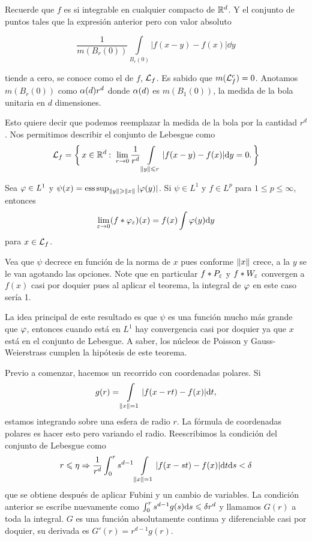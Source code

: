 \documentclass[12pt]{memoir}
\begin{document}
Recuerde que $f$ es  si integrable en cualquier compacto de $\mathbb{R}^d$. Y el conjunto de puntos tales que la expresión anterior pero con valor absoluto

$$\frac{1}{m(B_r(0))}\int\limits_{B_r(0)}|f(x-y)-f(x)|\dd y$$

tiende a cero, se conoce como el  de $f$, $\mathcal{L}_f$. Es sabido que $m(\mathcal{L}_f^c)=0$. Anotamos $m(B_r(0))$ como $\alpha(d)r^d$ donde $\alpha(d)$ es $m(B_1(0))$, la medida de la bola unitaria en $d$ dimensiones.\par 
Esto quiere decir que podemos reemplazar la medida de la bola por la cantidad $r^d$. Nos permitimos describir el conjunto de Lebesgue como
$$\mathcal{L}_f=\biggl\{\,x\in\mathbb{R}^d\mathbin{:}\ \lim_{r\to 0}\frac{1}{r^d}\int\limits_{\left\|y\right\|\leqslant r}|f(x-y)-f(x)|\dd y= 0.\,\biggr\}$$

\begin{Th}
  Sea $\varphi\in L^1$ y $\psi(x)=\operatorname*{ess\hspace{0.5mm}sup}_{\left\|y\right\|\geqslant\left\|x\right\|}|\varphi(y)|$. Si $\psi\in L^1$ y $f\in L^p$ para $1\leq p\leq \infty$, entonces 
  $$\lim_{\varepsilon\to 0}(f\ast \varphi_\varepsilon)(x)=f(x)\int\varphi(y)\dd y$$
  para $x\in\mathcal{L}_f$. 
\end{Th}

Vea que $\psi$ decrece en función de la norma de $x$ pues conforme $\left\|x\right\|$ crece, a la $y$ se le van agotando las opciones. Note que en particular $f\ast P_\varepsilon$ y $f\ast W_\varepsilon$ convergen a $f(x)$ casi por doquier pues al aplicar el teorema, la integral de $\varphi$ en este caso sería 1.\par 
La idea principal de este resultado es que $\psi$ es una función mucho más grande que $\varphi$, entonces cuando está en $L^1$ hay convergencia casi por doquier ya que $x$ está en el conjunto de Lebesgue. A saber, los núcleos de Poisson y Gauss-Weierstrass cumplen la hipótesis de este teorema.\par 
Previo a comenzar, hacemos un recorrido con coordenadas polares. Si 
$$g(r)=\int\limits_{\left\|x\right\|=1}|f(x-rt)-f(x)|\dd t,$$
estamos integrando sobre una esfera de radio $r$. La fórmula de coordenadas polares es hacer esto pero variando el radio. Reescribimos la condición del conjunto de Lebesgue como
$$r\leqslant \eta\Rightarrow \frac{1}{r^d}\int_0^r s^{d-1}\int\limits_{\left\|x\right\|=1}|f(x-st)-f(x)|\dd t\dd s<\delta$$
que se obtiene después de aplicar Fubini y un cambio de variables. La condición anterior se escribe nuevamente como $\int_0^rs^{d-1}g(s)\dd s\leqslant \delta r^d$ y llamamos $G(r)$ a toda la integral. $G$ es una función absolutamente continua y diferenciable casi por doquier, su derivada es $G'(r)=r^{d-1}g(r)$.
\end{document}

